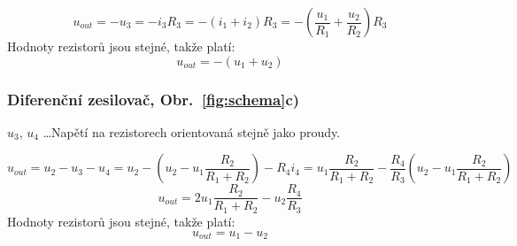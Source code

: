         $$ u_{out} = -u_3 = -i_3R_3 = -(i_1+i_2)R_3 = -(\frac{u_1}{R_1}+\frac{u_2}{R_2})R_3 $$
        Hodnoty rezistorů jsou stejné, takže platí:
        $$ u_{out} = -(u_1+u_2) $$

    \subsubsection{Diferenční zesilovač, Obr.~\ref{fig:schema}c)}
        $ u_3 $, $ u_4 $ \dots Napětí na rezistorech orientovaná stejně jako proudy. 

        $$ u_{out} = u_2-u_3-u_4 =u_2 -(u_2-u_1\frac{R_2}{R_1+R_2})-R_4i_4 =  u_1\frac{R_2}{R_1+R_2}-\frac{R_4}{R_3}(u_2-u_1\frac{R_2}{R_1+R_2}) $$
        $$ u_{out}= 2u_1\frac{R_2}{R_1+R_2} -u_2\frac{R_4}{R_3}$$
        Hodnoty rezistorů jsou stejné, takže platí:
        $$ u_{out}=u_1-u_2$$

